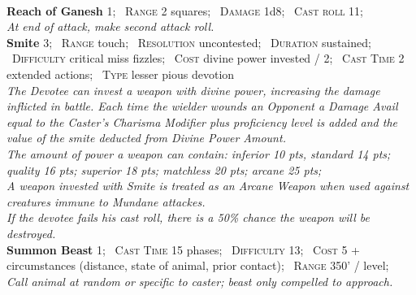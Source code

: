 \documentclass[11pt]{article}
\newcommand{\spell}[1]{{\sc\bfseries\large #1}}
\begin{document}
%
\\[4pt]
%
\spell{Reach of Ganesh} 1;
\ \textsc{Range} 2 squares;
\ \textsc{Damage} 1d8;
\ \textsc{Cast roll} 11;
\\
\textsl{At end of attack, make second attack roll.}
%
\\[4pt]
%
\spell{Smite} 3;
\ \textsc{Range} touch;
\ \textsc{Resolution} uncontested;
\ \textsc{Duration} sustained;
\ \textsc{Difficulty} critical miss fizzles;
\ \textsc{Cost} divine power invested / 2;
\ \textsc{Cast Time} 2 extended actions;
\ \textsc{Type} lesser pious devotion
\\
\textsl{The Devotee can invest a weapon with divine power, increasing
the damage inflicted in battle.  Each time the wielder wounds an
Opponent a Damage Avail equal to the Caster's Charisma Modifier plus proficiency
level is added and the value of the smite deducted from Divine Power
Amount.
\\[2pt]
The amount of power a weapon can contain: inferior 10 pts, standard 14
pts; quality 16 pts; superior 18 pts; matchless 20 pts; arcane
25 pts;
\\[2pt]
A weapon invested with Smite is treated as an Arcane Weapon when used
against creatures immune to Mundane attackes.
\\[2pt]
If the devotee fails his cast roll, there is a 50\% chance the weapon
will be destroyed.}
%
\\[4pt]
%
\spell{Summon Beast} 1;
\ \textsc{Cast Time} 15 phases;
\ \textsc{Difficulty} 13;
\ \textsc{Cost} 5 + circumstances (distance, state of animal, prior
contact);
\ \textsc{Range} 350' / level;
\\
\textsl{Call animal at random or specific to caster; beast only
  compelled to approach.}
\end{document}

